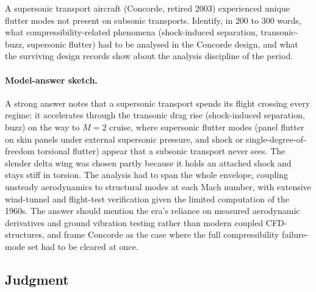 \begin{exercise}
A supersonic transport aircraft (Concorde, retired 2003)
experienced unique flutter modes not present on subsonic
transports. Identify, in $200$ to $300$ words, what
compressibility-related phenomena (shock-induced separation,
transonic-buzz, supersonic flutter) had to be analysed in the
Concorde design, and what the surviving design records show
about the analysis discipline of the period.
\paragraph{Model-answer sketch.} A strong answer notes that a
supersonic transport spends its flight crossing every regime: it
accelerates through the transonic drag rise (shock-induced separation,
buzz) on the way to $M = 2$ cruise, where supersonic flutter modes
(panel flutter on skin panels under external supersonic pressure, and
shock or single-degree-of-freedom torsional flutter) appear that a
subsonic transport never sees. The slender delta wing was chosen partly
because it holds an attached shock and stays stiff in torsion. The
analysis had to span the whole envelope, coupling unsteady aerodynamics
to structural modes at each Mach number, with extensive wind-tunnel and
flight-test verification given the limited computation of the 1960s.
The answer should mention the era's reliance on measured aerodynamic
derivatives and ground vibration testing rather than modern coupled
CFD-structures, and frame Concorde as the case where the full
compressibility failure-mode set had to be cleared at once.
\end{exercise}

\subsection*{Judgment}

